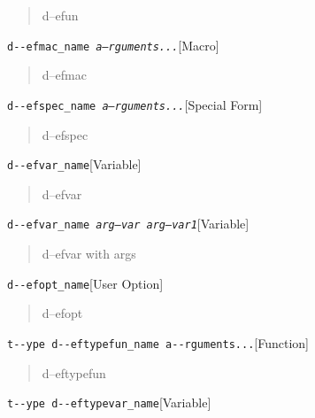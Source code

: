 \documentclass{book}
\begin{document}
\begin{titlepage}
%
\begin{quote}
d--efun
\end{quote}

\noindent\texttt{d{-}{-}efmac\_name \EmbracOn{}\textnormal{\textsl{a--rguments...}}\EmbracOff{}}\hfill[Macro]



%
\begin{quote}
d--efmac
\end{quote}

\noindent\texttt{d{-}{-}efspec\_name \EmbracOn{}\textnormal{\textsl{a--rguments...}}\EmbracOff{}}\hfill[Special Form]



%
\begin{quote}
d--efspec
\end{quote}

\noindent\texttt{d{-}{-}efvar\_name}\hfill[Variable]



%
\begin{quote}
d--efvar
\end{quote}

\noindent\texttt{d{-}{-}efvar\_name \EmbracOn{}\textnormal{\textsl{arg--var arg--var1}}\EmbracOff{}}\hfill[Variable]



%
\begin{quote}
d--efvar with args
\end{quote}

\noindent\texttt{d{-}{-}efopt\_name}\hfill[User Option]



%
\begin{quote}
d--efopt
\end{quote}

\noindent\texttt{t{-}{-}ype d{-}{-}eftypefun\_name a{-}{-}rguments...}\hfill[Function]



%
\begin{quote}
d--eftypefun
\end{quote}

\noindent\texttt{t{-}{-}ype d{-}{-}eftypevar\_name}\hfill[Variable]




\end{titlepage}
\end{document}
